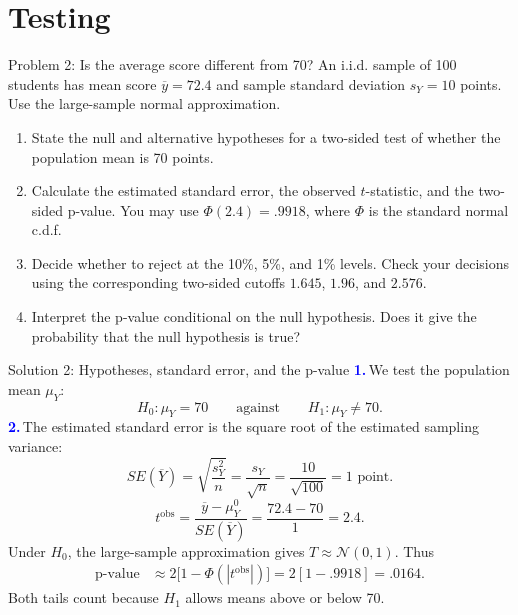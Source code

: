 \documentclass[notes,10pt, aspectratio=169]{beamer}
\newif\ifshowsolutions
\newcommand{\answerpart}[1]{\textcolor{blue}{\textbf{#1.}}\,}
\begin{document}
\section{Testing}

\begin{frame}{Problem 2: Is the average score different from 70?}
An i.i.d. sample of 100 students has mean score $\overline y=72.4$ and sample standard deviation $s_Y=10$ points. Use the large-sample normal approximation.
\begin{enumerate}
\setlength{\itemsep}{7pt}
\item State the null and alternative hypotheses for a two-sided test of whether the population mean is 70 points.
\item Calculate the estimated standard error, the observed $t$-statistic, and the two-sided p-value. You may use $\Phi(2.4)=.9918$, where $\Phi$ is the standard normal c.d.f.
\item Decide whether to reject at the 10\%, 5\%, and 1\% levels. Check your decisions using the corresponding two-sided cutoffs $1.645$, $1.96$, and $2.576$.
\item Interpret the p-value conditional on the null hypothesis. Does it give the probability that the null hypothesis is true?
\end{enumerate}
\end{frame}

\ifshowsolutions
\begin{frame}{Solution 2: Hypotheses, standard error, and the p-value}
\small
\answerpart{1}We test the population mean $\mu_Y$:
\[
H_0:\mu_Y=70\qquad\text{against}\qquad H_1:\mu_Y\ne70.
\]
\answerpart{2}The estimated standard error is the square root of the estimated sampling variance:
\[
SE(\overline Y)=\sqrt{\frac{s_Y^2}{n}}=\frac{s_Y}{\sqrt n}
=\frac{10}{\sqrt{100}}=1\text{ point}.
\]
\[
t^{\mathrm{obs}}=\frac{\overline y-\mu_Y^0}{SE(\overline Y)}
=\frac{72.4-70}{1}=\boxed{2.4}.
\]
Under $H_0$, the large-sample approximation gives $T\approx\mathcal N(0,1)$. Thus
\begin{align*}
\text{p-value}&\approx2\bigl[1-\Phi(|t^{\mathrm{obs}}|)\bigr]
=2[1-.9918]=\boxed{.0164}.
\end{align*}
Both tails count because $H_1$ allows means above or below 70.
\end{frame}
\end{document}
